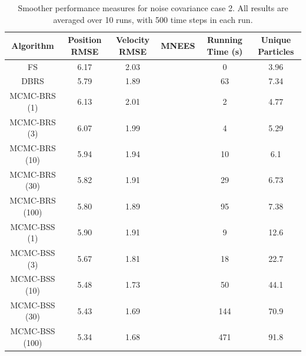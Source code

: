 \documentclass[10pt,twocolumn,twoside]{IEEEtran}
\begin{document}
\begin{table}[!t]%
\renewcommand{\arraystretch}{1.3}
\caption{Smoother performance measures for noise covariance case 2. All results are averaged over 10 runs, with 500 time steps in each run.}
\label{tab:case2_performance}
{\scriptsize
\centering
\begin{tabular}{|c||c|c|c|c|c|}
\hline
Algorithm & \begin{minipage}[c]{0.9cm} Position RMSE \end{minipage} & \begin{minipage}[c]{0.9cm}  Velocity RMSE \end{minipage} & \begin{minipage}[c]{0.9cm}  MNEES \end{minipage} & \begin{minipage}[c]{0.9cm}  Running Time (s) \end{minipage} & \begin{minipage}[c]{0.9cm}  Unique Particles \end{minipage} \\
\hline
FS              & 6.17 & 2.03 &  & 0 & 3.96 \\
DBRS            & 5.79 & 1.89 &  & 63 & 7.34 \\
\hline
MCMC-BRS (1)	& 6.13 & 2.01 &  & 2 & 4.77 \\
MCMC-BRS (3)	& 6.07 & 1.99 &  & 4 & 5.29 \\
MCMC-BRS (10)	& 5.94 & 1.94 &  & 10 & 6.1 \\
MCMC-BRS (30)	& 5.82 & 1.91 &  & 29 & 6.73 \\
MCMC-BRS (100)  & 5.80 & 1.89 &  & 95 & 7.38 \\
\hline
MCMC-BSS (1)	& 5.90 & 1.91 &  & 9 & 12.6 \\
MCMC-BSS (3)	& 5.67 & 1.81 &  & 18 & 22.7 \\
MCMC-BSS (10)	& 5.48 & 1.73 &  & 50 & 44.1 \\
MCMC-BSS (30)	& 5.43 & 1.69 &  & 144 & 70.9 \\
MCMC-BSS (100)  & 5.34 & 1.68 &  & 471 & 91.8 \\
\hline
\end{tabular}
}
\end{table}
\end{document}
